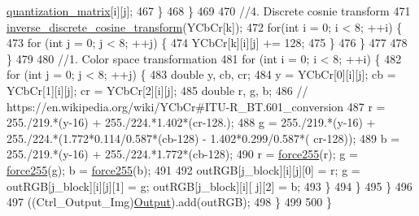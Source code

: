 \begin{DoxyCode}
      \hyperlink{classdomini_1_1algorithm_1_1JPEG_a7c95eb140dbe185a31b402d48ec17a66}{quantization\_matrix}[i][j];
467                         \}
468                     \}
469 
470                     \textcolor{comment}{//4. Discrete cosnie transform}
471                     \hyperlink{classdomini_1_1algorithm_1_1JPEG_a3a6e16b0ee34746e4b0118ed9107bd75}{inverse\_discrete\_cosine\_transform}(YCbCr[k]);
472                     \textcolor{keywordflow}{for}(\textcolor{keywordtype}{int} i = 0; i < 8; ++i) \{
473                         \textcolor{keywordflow}{for} (\textcolor{keywordtype}{int} j = 0; j < 8; ++j) \{
474                             YCbCr[k][i][j] += 128;
475                         \}
476                     \}
477 
478                 \}
479 
480                 \textcolor{comment}{//1. Color space transformation}
481                 \textcolor{keywordflow}{for} (\textcolor{keywordtype}{int} i = 0; i < 8; ++i) \{
482                     \textcolor{keywordflow}{for} (\textcolor{keywordtype}{int} j = 0; j < 8; ++j) \{
483                         \textcolor{keywordtype}{double} y, cb, cr;
484                         y = YCbCr[0][i][j]; cb = YCbCr[1][i][j]; cr = YCbCr[2][i][j];
485                         \textcolor{keywordtype}{double} r, g, b;
486                         \textcolor{comment}{// https://en.wikipedia.org/wiki/YCbCr#ITU-R\_BT.601\_conversion}
487                         r = 255./219.*(y-16) + 255./224.*1.402*(cr-128.);
488                         g = 255./219.*(y-16) + 255./224.*(1.772*0.114/0.587*(cb-128) - 1.402*0.299/0.587*(
      cr-128));
489                         b = 255./219.*(y-16) + 255./224.*1.772*(cb-128);
490                         r = \hyperlink{classdomini_1_1algorithm_1_1JPEG_af86bdbb6b6f5671abff6bc6bd5f6349d}{force255}(r); g = \hyperlink{classdomini_1_1algorithm_1_1JPEG_af86bdbb6b6f5671abff6bc6bd5f6349d}{force255}(g); b = 
      \hyperlink{classdomini_1_1algorithm_1_1JPEG_af86bdbb6b6f5671abff6bc6bd5f6349d}{force255}(b);
491                         
492                         outRGB[j\_block][i][j][0] = r; g = outRGB[j\_block][i][j][1] = g; outRGB[j\_block][i][
      j][2] = b;
493                     \}
494                 \}
495             \}
496 
497             ((Ctrl\_Output\_Img)\hyperlink{classdomini_1_1algorithm_1_1Algorithm_a4de9955411c656325adc391ef570c082}{Output}).add(outRGB);
498         \}
499 
500     \}
\end{DoxyCode}
\mbox{\label{classdomini_1_1algorithm_1_1JPEG_a367e6d1e6543bf3d8c847aae36f4b6bf}} 
